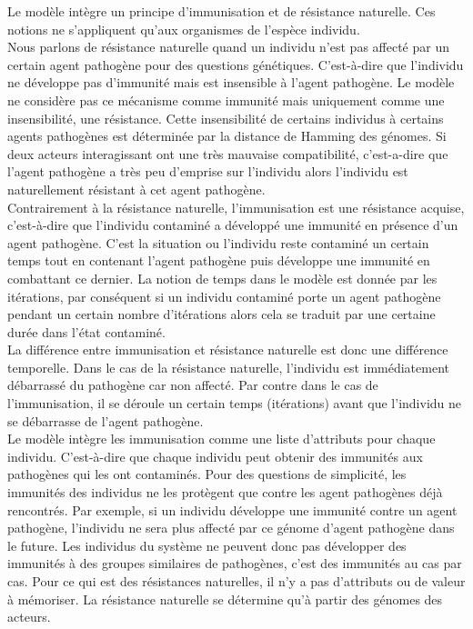 Le modèle intègre un principe d'immunisation et de résistance naturelle. Ces notions ne s'appliquent qu'aux organismes de l'espèce individu.\\

Nous parlons de résistance naturelle quand un individu n'est pas affecté par un certain agent pathogène pour des questions génétiques. C'est-à-dire que l'individu ne développe pas d'immunité mais est insensible à l'agent pathogène. Le modèle ne considère pas ce mécanisme comme immunité mais uniquement comme une insensibilité, une résistance. Cette insensibilité de certains individus à certains agents pathogènes est déterminée par la distance de Hamming des génomes. Si deux acteurs interagissant ont une très mauvaise compatibilité, c'est-a-dire que l'agent pathogène a très peu d'emprise sur l'individu alors l'individu est naturellement résistant à cet agent pathogène.\\

Contrairement à la résistance naturelle, l'immunisation est une résistance acquise, c'est-à-dire que l'individu contaminé a développé une immunité en présence d'un agent pathogène. C'est la situation ou l'individu reste contaminé un certain temps tout en contenant l'agent pathogène puis développe une immunité en combattant ce dernier. La notion de temps dans le modèle est donnée par les itérations, par conséquent si un individu contaminé porte un agent pathogène pendant un certain nombre d'itérations alors cela se traduit par une certaine durée dans l'état contaminé.\\

La différence entre immunisation et résistance naturelle est donc une différence temporelle. Dans le cas de la résistance naturelle, l'individu est immédiatement débarrassé du pathogène car non affecté. Par contre dans le cas de l'immunisation, il se déroule un certain temps (itérations) avant que l'individu ne se débarrasse de l'agent pathogène.\\

Le modèle intègre les immunisation comme une liste d'attributs pour chaque individu. C'est-à-dire que chaque individu peut obtenir des immunités aux pathogènes qui les ont contaminés. Pour des questions de simplicité, les immunités des individus ne les protègent que contre les agent pathogènes déjà rencontrés. Par exemple, si un individu développe une immunité contre un agent pathogène, l'individu ne sera plus affecté par ce génome d'agent pathogène dans le future. Les individus du système ne peuvent donc pas développer des immunités à des groupes similaires de pathogènes, c'est des immunités au cas par cas. Pour ce qui est des résistances naturelles, il n'y a pas d'attributs ou de valeur à mémoriser. La résistance naturelle se détermine qu'à partir des génomes des acteurs.\\

